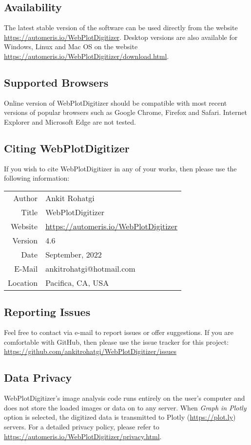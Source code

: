 \documentclass[letterpaper, 11pt]{article}
\begin{document}
\subsection{Availability}
The latest stable version of the software can be used directly from the website \url{https://automeris.io/WebPlotDigitizer}. Desktop versions are also available for Windows, Linux and Mac OS on the website \url{https://automeris.io/WebPlotDigitizer/download.html}.

\subsection{Supported Browsers}
Online version of WebPlotDigitizer should be compatible with most recent versions of popular browsers such as Google Chrome, Firefox and Safari. Internet Explorer and Microsoft Edge are not tested.

\subsection{Citing WebPlotDigitizer}
If you wish to cite WebPlotDigitizer in any of your works, then please use the following information:

\begin{center}
\begin{tabular}{|r|l|}
\hline
Author & Ankit Rohatgi\\
Title & WebPlotDigitizer\\
Website & \url{https://automeris.io/WebPlotDigitizer}\\
Version & 4.6\\
Date & September, 2022\\
E-Mail & ankitrohatgi@hotmail.com\\
Location & Pacifica, CA, USA\\
\hline
\end{tabular}
\end{center}

\subsection{Reporting Issues}
Feel free to contact via e-mail to report issues or offer suggestions. If you are comfortable with GitHub, then please use the issue tracker for this project: \url{https://github.com/ankitrohatgi/WebPlotDigitizer/issues}

\subsection{Data Privacy}
WebPlotDigitizer's image analysis code runs entirely on the user's computer and does not store the loaded images or data on to any server. When \emph{Graph in Plotly} option is selected, the digitized data is transmitted to Plotly (\url{https://plot.ly}) servers. For a detailed privacy policy, please refer to \url{https://automeris.io/WebPlotDigitizer/privacy.html}.
\end{document}
